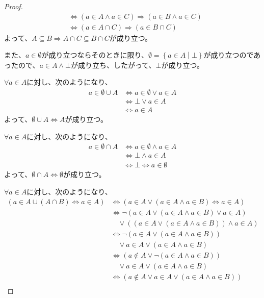 \documentclass[a4paper]{jsarticle}
\begin{document}
\begin{proof}
\begin{align*}
&\Leftrightarrow (a \in A \land a \in C) \Rightarrow (a \in B \land a \in C)\\
&\Leftrightarrow (a \in A \cap C) \Rightarrow (a \in B \cap C)
\end{align*}
よって、$A \subseteq B \Rightarrow A \cap C \subseteq B \cap C$が成り立つ。\par
また、$a \in \emptyset$が成り立つならそのときに限り、$\emptyset = \left\{ a \in A \middle| \bot \right\}$が成り立つのであったので、$a \in A \land \bot$が成り立ち、したがって、$\bot$が成り立つ。\par
$\forall a \in A$に対し、次のようになり、
\begin{align*}
a \in \emptyset \cup A &\Leftrightarrow a \in \emptyset \vee a \in A \\
&\Leftrightarrow \bot \vee a \in A \\
&\Leftrightarrow a \in A
\end{align*}
よって、$\emptyset \cup A \Leftrightarrow A$が成り立つ。\par
$\forall a \in A$に対し、次のようになり、
\begin{align*}
a \in \emptyset \cap A &\Leftrightarrow a \in \emptyset \land a \in A \\
&\Leftrightarrow \bot \land a \in A \\
&\Leftrightarrow \bot \Leftrightarrow a \in \emptyset
\end{align*}
よって、$\emptyset \cap A \Leftrightarrow \emptyset$が成り立つ。\par
$\forall a \in A$に対し、次のようになり、
\begin{align*}
\left( a \in A \cup (A \cap B) \Leftrightarrow a \in A \right) &\Leftrightarrow \left( a \in A \vee (a \in A \land a \in B) \Leftrightarrow a \in A \right)\\
&\Leftrightarrow \neg\left( a \in A \vee (a \in A \land a \in B) \vee a \in A \right) \\
&\quad \vee \left( \left( a \in A \vee (a \in A \land a \in B) \right) \land a \in A \right)\\
&\Leftrightarrow \neg\left( a \in A \vee (a \in A \land a \in B) \right) \\
&\quad \vee a \in A \vee (a \in A \land a \in B)\\
&\Leftrightarrow \left( a \notin A \vee \neg(a \in A \land a \in B) \right) \\
&\quad \vee a \in A \vee (a \in A \land a \in B)\\
&\Leftrightarrow \left( a \notin A \vee a \in A \vee (a \in A \land a \in B) \right) \\

\end{align*}
\end{proof}
\end{document}
